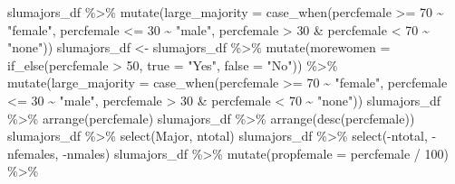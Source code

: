 \documentclass[
]{book}
\newenvironment{Shaded}{\begin{snugshade}}{\end{snugshade}}
\newcommand{\AttributeTok}[1]{\textcolor[rgb]{0.77,0.63,0.00}{#1}}
\newcommand{\DecValTok}[1]{\textcolor[rgb]{0.00,0.00,0.81}{#1}}
\newcommand{\FunctionTok}[1]{\textcolor[rgb]{0.00,0.00,0.00}{#1}}
\newcommand{\NormalTok}[1]{#1}
\newcommand{\OtherTok}[1]{\textcolor[rgb]{0.56,0.35,0.01}{#1}}
\newcommand{\SpecialCharTok}[1]{\textcolor[rgb]{0.00,0.00,0.00}{#1}}
\newcommand{\StringTok}[1]{\textcolor[rgb]{0.31,0.60,0.02}{#1}}
\begin{document}
\begin{Shaded}
\begin{Highlighting}[]
\NormalTok{slumajors\_df }\SpecialCharTok{\%\textgreater{}\%} \FunctionTok{mutate}\NormalTok{(}\AttributeTok{large\_majority =}
                          \FunctionTok{case\_when}\NormalTok{(percfemale }\SpecialCharTok{\textgreater{}=} \DecValTok{70} \SpecialCharTok{\textasciitilde{}} \StringTok{"female"}\NormalTok{,}
\NormalTok{                                    percfemale }\SpecialCharTok{\textless{}=} \DecValTok{30} \SpecialCharTok{\textasciitilde{}} \StringTok{"male"}\NormalTok{,}
\NormalTok{                                    percfemale }\SpecialCharTok{\textgreater{}} \DecValTok{30} \SpecialCharTok{\&}\NormalTok{ percfemale }\SpecialCharTok{\textless{}} \DecValTok{70} \SpecialCharTok{\textasciitilde{}} \StringTok{"none"}\NormalTok{)) }
\NormalTok{slumajors\_df }\OtherTok{\textless{}{-}}\NormalTok{ slumajors\_df }\SpecialCharTok{\%\textgreater{}\%}
  \FunctionTok{mutate}\NormalTok{(}\AttributeTok{morewomen =} \FunctionTok{if\_else}\NormalTok{(percfemale }\SpecialCharTok{\textgreater{}} \DecValTok{50}\NormalTok{,}
                             \AttributeTok{true =} \StringTok{"Yes"}\NormalTok{,}
                             \AttributeTok{false =} \StringTok{"No"}\NormalTok{)) }\SpecialCharTok{\%\textgreater{}\%}
  \FunctionTok{mutate}\NormalTok{(}\AttributeTok{large\_majority =}
           \FunctionTok{case\_when}\NormalTok{(percfemale }\SpecialCharTok{\textgreater{}=} \DecValTok{70} \SpecialCharTok{\textasciitilde{}} \StringTok{"female"}\NormalTok{,}
\NormalTok{                     percfemale }\SpecialCharTok{\textless{}=} \DecValTok{30} \SpecialCharTok{\textasciitilde{}} \StringTok{"male"}\NormalTok{,}
\NormalTok{                     percfemale }\SpecialCharTok{\textgreater{}} \DecValTok{30} \SpecialCharTok{\&}\NormalTok{ percfemale }\SpecialCharTok{\textless{}} \DecValTok{70} \SpecialCharTok{\textasciitilde{}} \StringTok{"none"}\NormalTok{)) }
\NormalTok{slumajors\_df }\SpecialCharTok{\%\textgreater{}\%} \FunctionTok{arrange}\NormalTok{(percfemale)}
\NormalTok{slumajors\_df }\SpecialCharTok{\%\textgreater{}\%} \FunctionTok{arrange}\NormalTok{(}\FunctionTok{desc}\NormalTok{(percfemale))}
\NormalTok{slumajors\_df }\SpecialCharTok{\%\textgreater{}\%} \FunctionTok{select}\NormalTok{(Major, ntotal)}
\NormalTok{slumajors\_df }\SpecialCharTok{\%\textgreater{}\%} \FunctionTok{select}\NormalTok{(}\SpecialCharTok{{-}}\NormalTok{ntotal, }\SpecialCharTok{{-}}\NormalTok{nfemales, }\SpecialCharTok{{-}}\NormalTok{nmales)}
\NormalTok{slumajors\_df }\SpecialCharTok{\%\textgreater{}\%} \FunctionTok{mutate}\NormalTok{(}\AttributeTok{propfemale =}\NormalTok{ percfemale }\SpecialCharTok{/} \DecValTok{100}\NormalTok{) }\SpecialCharTok{\%\textgreater{}\%}

\end{Highlighting}
\end{Shaded}
\end{document}
